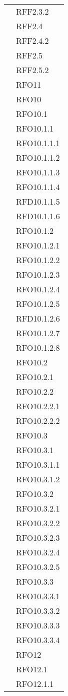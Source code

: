 \begin{longtable}{ p{12cm} | p{4cm} }
		    & RFF2.3.2 \\
		    & RFF2.4 \\
		    & RFF2.4.2 \\
		    & RFF2.5 \\
		    & RFF2.5.2 \\
		    & RFO11 \\
		    & RFO10 \\
& RFO10.1 \\
& RFO10.1.1 \\
& RFO10.1.1.1 \\
& RFO10.1.1.2 \\
& RFO10.1.1.3 \\
& RFO10.1.1.4 \\
& RFD10.1.1.5 \\
& RFD10.1.1.6 \\
& RFO10.1.2 \\
& RFO10.1.2.1 \\
& RFO10.1.2.2 \\
& RFO10.1.2.3 \\
& RFO10.1.2.4 \\
& RFO10.1.2.5 \\
& RFD10.1.2.6 \\
& RFO10.1.2.7 \\
& RFO10.1.2.8 \\
& RFO10.2 \\
& RFO10.2.1 \\
& RFO10.2.2 \\
& RFO10.2.2.1 \\
& RFO10.2.2.2 \\
& RFO10.3 \\
& RFO10.3.1 \\
& RFO10.3.1.1 \\
& RFO10.3.1.2 \\
& RFO10.3.2 \\
& RFO10.3.2.1 \\
& RFO10.3.2.2 \\
& RFO10.3.2.3 \\
& RFO10.3.2.4 \\
& RFO10.3.2.5 \\
& RFO10.3.3 \\
& RFO10.3.3.1 \\
& RFO10.3.3.2 \\
& RFO10.3.3.3 \\
& RFO10.3.3.4 \\
& RFO12 \\
& RFO12.1 \\
& RFO12.1.1 \\

\end{longtable}
